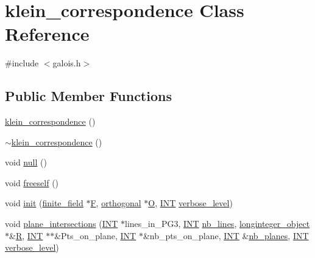 \hypertarget{classklein__correspondence}{}\section{klein\+\_\+correspondence Class Reference}
\label{classklein__correspondence}


{\ttfamily \#include $<$galois.\+h$>$}

\subsection*{Public Member Functions}
\begin{DoxyCompactItemize}
\item 
\mbox{\hyperlink{classklein__correspondence_adeeae8021b4f43add6f21d6b726bf06b}{klein\+\_\+correspondence}} ()
\item 
\mbox{\hyperlink{classklein__correspondence_ac9ba38c424cdbe34047e5722dd9a5358}{$\sim$klein\+\_\+correspondence}} ()
\item 
void \mbox{\hyperlink{classklein__correspondence_a633b72e22929d30fc79cd6b8e6926e08}{null}} ()
\item 
void \mbox{\hyperlink{classklein__correspondence_a4f2fcdff050f5a8f1b19dda0a55ae063}{freeself}} ()
\item 
void \mbox{\hyperlink{classklein__correspondence_a9f555dc65174ab66579e1118bd9b4ca0}{init}} (\mbox{\hyperlink{classfinite__field}{finite\+\_\+field}} $\ast$\mbox{\hyperlink{classklein__correspondence_a0559375273b3910894635a5036afcdd9}{F}}, \mbox{\hyperlink{classorthogonal}{orthogonal}} $\ast$\mbox{\hyperlink{classklein__correspondence_a38becc70e93298d33c09f224d385ec08}{O}}, \mbox{\hyperlink{galois_8h_a09fddde158a3a20bd2dcadb609de11dc}{I\+NT}} \mbox{\hyperlink{simeon_8_c_a818073fbcc2f439e7c56952f67386122}{verbose\+\_\+level}})
\item 
void \mbox{\hyperlink{classklein__correspondence_a561aa0d3a66d19a10f9945561a5880b5}{plane\+\_\+intersections}} (\mbox{\hyperlink{galois_8h_a09fddde158a3a20bd2dcadb609de11dc}{I\+NT}} $\ast$lines\+\_\+in\+\_\+\+P\+G3, \mbox{\hyperlink{galois_8h_a09fddde158a3a20bd2dcadb609de11dc}{I\+NT}} \mbox{\hyperlink{hamming_8_c_ac0679276a2483f153f00d12bd590f382}{nb\+\_\+lines}}, \mbox{\hyperlink{classlonginteger__object}{longinteger\+\_\+object}} $\ast$\&\mbox{\hyperlink{pentomino__5x5_8_c_a9e6c5a8291295bd0292db81cc90cb2cf}{R}}, \mbox{\hyperlink{galois_8h_a09fddde158a3a20bd2dcadb609de11dc}{I\+NT}} $\ast$$\ast$\&Pts\+\_\+on\+\_\+plane, \mbox{\hyperlink{galois_8h_a09fddde158a3a20bd2dcadb609de11dc}{I\+NT}} $\ast$\&nb\+\_\+pts\+\_\+on\+\_\+plane, \mbox{\hyperlink{galois_8h_a09fddde158a3a20bd2dcadb609de11dc}{I\+NT}} \&\mbox{\hyperlink{hamming_8_c_a91ce15bbcb035246151f54bb92118e70}{nb\+\_\+planes}}, \mbox{\hyperlink{galois_8h_a09fddde158a3a20bd2dcadb609de11dc}{I\+NT}} \mbox{\hyperlink{simeon_8_c_a818073fbcc2f439e7c56952f67386122}{verbose\+\_\+level}})
\end{DoxyCompactItemize}
